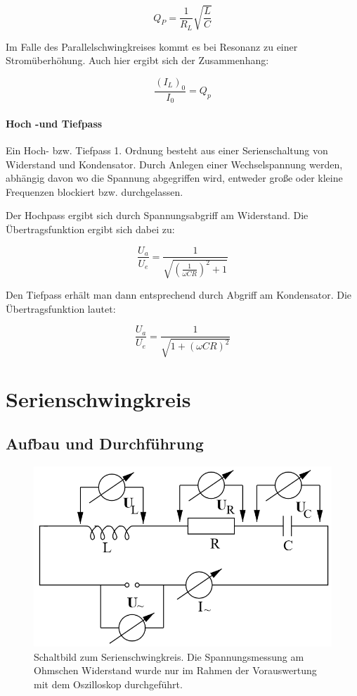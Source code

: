 \documentclass[12pt,a4paper]{article}
\begin{document}
\begin{equation}
Q_P = \frac{1}{R_L} \sqrt{\frac{L}{C}}
\label{equ:Güte_Bauteile}
\end{equation}

Im Falle des Parallelschwingkreises kommt es bei Resonanz zu einer Stromüberhöhung. Auch hier ergibt sich der Zusammenhang:

\begin{equation}
\frac{(I_L)_0}{I_0} = Q_p
\end{equation}

\paragraph{Hoch -und Tiefpass}
Ein Hoch- bzw. Tiefpass 1. Ordnung besteht aus einer Serienschaltung von Widerstand und Kondensator. Durch Anlegen einer Wechselspannung werden, abhängig davon wo die Spannung abgegriffen wird, entweder große oder kleine Frequenzen blockiert bzw. durchgelassen.

Der Hochpass ergibt sich durch Spannungsabgriff am Widerstand. Die Übertragsfunktion ergibt sich dabei zu:

\begin{equation}
\frac{U_a}{U_e} = \frac{1}{\sqrt{(\frac{1}{\omega C R})^2+1}}
\end{equation}

Den Tiefpass erhält man dann entsprechend durch Abgriff am Kondensator. Die Übertragsfunktion lautet:

\begin{equation}
\frac{U_a}{U_e} = \frac{1}{\sqrt{1+(\omega C R)^2}}
\end{equation}

\section{Serienschwingkreis}


\subsection{Aufbau und Durchführung}

\begin{figure}
\centering
\includegraphics[scale=0.8]{Bilder/AufbauSerie.png}
\caption{Schaltbild zum Serienschwingkreis. Die Spannungsmessung am Ohmschen Widerstand wurde nur im Rahmen der Vorauswertung mit dem Oszilloskop durchgeführt.}
\label{fig:AufbauSerie}
\end{figure}
\end{document}
